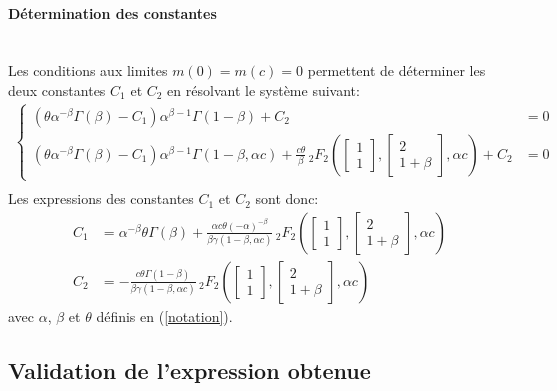 \paragraph{Détermination des constantes}\phantom{}\\
Les conditions aux limites $m(0)=m(c)=0$ permettent de déterminer les deux constantes $C_1$ et $C_2$ en résolvant le système suivant: 
\begin{align*}
\left\{\begin{aligned}
(\theta\alpha^{-\beta}\Gamma(\beta)-C_1)\alpha^{\beta-1}\Gamma(1-\beta) + C_2 &= 0\\
(\theta\alpha^{-\beta}\Gamma(\beta)-C_1)\alpha^{\beta-1}\Gamma(1-\beta,\alpha c) + \frac{c\theta}{\beta}\,{}_2F_2\left(\begin{bmatrix}1\\1\end{bmatrix},\begin{bmatrix}2\\1+\beta\end{bmatrix},\alpha c\right)+ C_2 &= 0
\end{aligned}\right. \\
\end{align*}
Les expressions des constantes $C_1$ et $C_2$ sont donc:
\begin{equation}\label{mean_constants}
    \begin{aligned}
        C_1 &= \alpha^{-\beta}\theta\Gamma(\beta)+\frac{\alpha c \theta {(-\alpha)}^{-\beta}}{\beta\gamma(1-\beta,\alpha c)}\,{}_2F_2\left(\begin{bmatrix}1\\1\end{bmatrix},\begin{bmatrix}2\\1+\beta\end{bmatrix},\alpha c\right) \\
        C_2 &= -\frac{c\theta\Gamma(1-\beta)}{\beta\gamma(1-\beta,\alpha c)}\,{}_2F_2\left(\begin{bmatrix}1\\1\end{bmatrix},\begin{bmatrix}2\\1+\beta\end{bmatrix},\alpha c\right)
    \end{aligned}
\end{equation}
avec $\alpha$, $\beta$ et $\theta$ définis en (\ref{notation}).
\subsection{Validation de l'expression obtenue}

